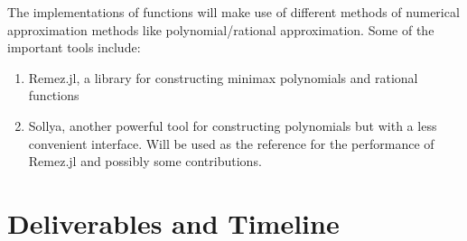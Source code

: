 \documentclass{article}
\theoremstyle{mytheoremstyle}
\theoremstyle{mytheoremstyle}
\theoremstyle{myproblemstyle}
\begin{document}
      The implementations of functions will make use of different methods  of numerical approximation methods like polynomial/rational approximation. 
      Some of the important tools include: \begin{enumerate}
        \item Remez.jl, a library for constructing minimax polynomials and rational functions 
        \item Sollya, another powerful tool for constructing polynomials but with a less convenient interface. Will be used as the reference for the performance of Remez.jl and possibly some contributions.
      \end{enumerate}
    
  \section*{Deliverables and Timeline}\label{sec:Methods} %
\end{document}
